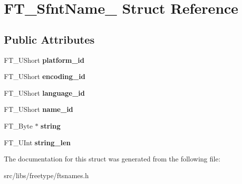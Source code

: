 \hypertarget{struct_f_t___sfnt_name__}{
\section{FT\_\-SfntName\_\- Struct Reference}
\label{struct_f_t___sfnt_name__}
}
\subsection*{Public Attributes}
\begin{DoxyCompactItemize}
\item 
\hypertarget{struct_f_t___sfnt_name___ae92450a058eb4737df85f66226d69f43}{
FT\_\-UShort {\bfseries platform\_\-id}}
\label{struct_f_t___sfnt_name___ae92450a058eb4737df85f66226d69f43}

\item 
\hypertarget{struct_f_t___sfnt_name___a01f4573605eab3f4d2e4b9b50b0de98f}{
FT\_\-UShort {\bfseries encoding\_\-id}}
\label{struct_f_t___sfnt_name___a01f4573605eab3f4d2e4b9b50b0de98f}

\item 
\hypertarget{struct_f_t___sfnt_name___a6fb23e0f299a97b25b63805b04cf1fc5}{
FT\_\-UShort {\bfseries language\_\-id}}
\label{struct_f_t___sfnt_name___a6fb23e0f299a97b25b63805b04cf1fc5}

\item 
\hypertarget{struct_f_t___sfnt_name___ac07be3e852408990fe0a910f00b68f4e}{
FT\_\-UShort {\bfseries name\_\-id}}
\label{struct_f_t___sfnt_name___ac07be3e852408990fe0a910f00b68f4e}

\item 
\hypertarget{struct_f_t___sfnt_name___ab369e2c3d8dc9662f69c53e4d3158067}{
FT\_\-Byte $\ast$ {\bfseries string}}
\label{struct_f_t___sfnt_name___ab369e2c3d8dc9662f69c53e4d3158067}

\item 
\hypertarget{struct_f_t___sfnt_name___a4ebdb7207b5681d16f9cc17f432cb56f}{
FT\_\-UInt {\bfseries string\_\-len}}
\label{struct_f_t___sfnt_name___a4ebdb7207b5681d16f9cc17f432cb56f}

\end{DoxyCompactItemize}


The documentation for this struct was generated from the following file:\begin{DoxyCompactItemize}
\item 
src/libs/freetype/ftsnames.h\end{DoxyCompactItemize}
